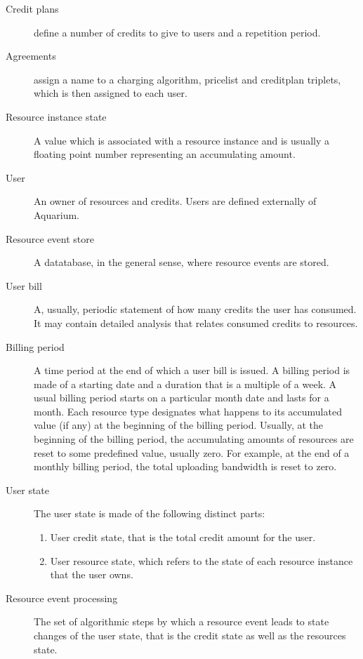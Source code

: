 \documentclass[preprint,10pt]{sigplanconf}
\begin{document}
\begin{description}
\item[Credit plans] define a number of credits to give to users and a repetition
        period.

\item[Agreements] assign a name to a charging algorithm, pricelist and creditplan triplets,
        which is then assigned to each user.
        

\item[Resource instance state]
A value which is associated with a resource instance and is usually a floating point number representing an accumulating amount.

\item[User]
An owner of resources and credits. Users are defined externally of Aquarium.

\item[Resource event store]
A datatabase, in the general sense, where resource events are stored.

\item[User bill]
A, usually, periodic statement of how many credits the user has consumed. It may contain detailed analysis that relates consumed credits to resources.
  
\item[Billing period]
A time period at the end of which a user bill is issued.
A billing period is made of a starting date and a duration that is a multiple of a week.
A usual billing period starts on a particular month date and lasts for a month.
Each resource type designates what happens to its accumulated value (if any) at the beginning of the billing period. Usually, at the beginning of the billing period, the accumulating amounts of resources are reset to some predefined value, usually zero. For example, at the end of a monthly billing period, the total uploading bandwidth is reset to zero.
   
\item[User state]
The user state is made of the following distinct parts:
\begin{enumerate}
\item User credit state, that is the total credit amount for the user.

\item User resource state, which refers to the state of each resource instance that the user owns.
\end{enumerate}

\item[Resource event processing]
The set of algorithmic steps by which a resource event leads to state changes of the user state, that is the credit state as well as the resources state.

\end{description}
\end{document}
